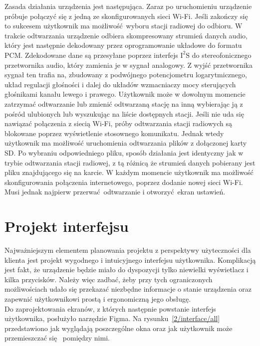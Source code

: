\documentclass[polish]{aghengthesis}
\newcommand{\isqs}{$\text{I}^{2}\text{S}$}
\begin{document}
			Zasada działania urządzenia jest następująca.
			Zaraz po uruchomieniu urządzenie próbuje połączyć się z jedną ze skonfigurowanych sieci Wi-Fi.
			Jeśli zakończy się to sukcesem użytkownik ma możliwość wyboru stacji radiowej do odbioru. W trakcie odtwarzania urządzenie odbiera skompresowany strumień danych audio, który jest następnie dekodowany przez oprogramowanie układowe do formatu PCM. Zdekodowane dane są przesyłane poprzez interfejs \isqs{} do stereofonicznego przetwornika audio, który zamienia je w sygnał analogowy. Z wyjść przetwornika sygnał ten trafia na, zbudowany z podwójnego potencjometru logarytmicznego, układ regulacji głośności i dalej do układów wzmacniaczy mocy sterujących głośnikami kanału lewego i prawego.
			Użytkownik może w dowolnym momencie zatrzymać odtwarzanie lub zmienić odtwarzaną stację na inną wybierając ją z pośród ulubionych lub wyszukując na liście dostępnych stacji.
			Jeśli nie uda się nawiązać połączenia z siecią Wi-Fi, próby odtwarzania stacji radiowych są blokowane poprzez wyświetlenie stosownego komunikatu.
			Jednak wtedy użytkownik ma możliwość uruchomienia odtwarzania plików z dołączonej karty SD. Po wybraniu odpowiedniego pliku, sposób działania jest identyczny jak w trybie odtwarzania stacji radiowej, z tą różnicą że strumień danych pobierany jest pliku znajdującego się na karcie. 
			W każdym momencie użytkownik ma możliwość skonfigurowania połączenia internetowego, poprzez dodanie nowej sieci Wi-Fi.
			Musi jednak najpierw przerwać odtwarzanie i otworzyć ekran ustawień.
	
	\section{Projekt interfejsu}
		\label{sec:ui}
		Najważniejszym elementem planowania projektu z perspektywy użyteczności dla klienta jest projekt wygodnego i intuicyjnego interfejsu użytkownika. Komplikacją jest fakt, że urządzenie będzie miało do dyspozycji tylko niewielki wyświetlacz i kilka przycisków.
		Należy więc zadbać, żeby przy tych ograniczonych możliwościach udało się przekazać niezbędne informacje o stanie urządzenia oraz zapewnić użytkownikowi prostą i ergonomiczną jego obsługę.
		$ $\\

		Do zaprojektowania ekranów, z których następnie powstanie interfejs użytkownika, posłużyło narzędzie Figma\textsuperscript{\cite{figma}}. Na rysunku~\ref{2/interface/all} przedstawiono jak wyglądają poszczególne okna oraz jak użytkownik może przemieszczać się  pomiędzy nimi.
		
\end{document}
